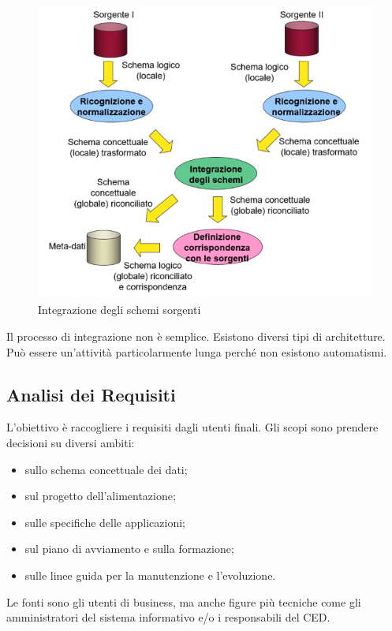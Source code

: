 \begin{figure}[H]
	\begin{center}
		\includegraphics[width=0.5\linewidth]{img/integration.PNG}
		\caption{Integrazione degli schemi sorgenti}
	\end{center}
\end{figure}
\noindent Il processo di integrazione non è semplice. Esistono diversi tipi di architetture. Può essere un'attività particolarmente lunga perché non esistono automatismi.

\subsection{Analisi dei Requisiti}
L'obiettivo è raccogliere i requisiti dagli utenti finali. Gli scopi sono prendere decisioni su diversi ambiti:
\begin{itemize}
	\item sullo schema concettuale dei dati;
	\item sul progetto dell'alimentazione;
	\item sulle specifiche delle applicazioni;
	\item sul piano di avviamento e sulla formazione;
	\item sulle linee guida per la manutenzione e l'evoluzione.
\end{itemize}
Le fonti sono gli utenti di business, ma anche figure più tecniche come gli amministratori del sistema informativo e/o i responsabili del CED.

